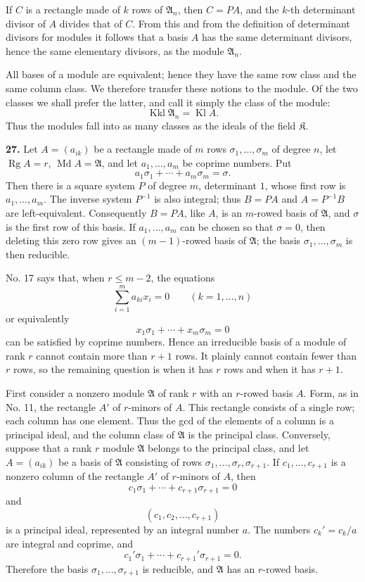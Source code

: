 \documentclass[11pt,a4paper]{article}
\newcommand{\K}{\mathfrak K}
\newcommand{\Kl}{\operatorname{Kl}}
\newcommand{\Kkl}{\operatorname{Kkl}}
\begin{document}
If \(C\) is a rectangle made of \(k\) rows of \(\mathfrak A_n\), then \(C=PA\), and the \(k\)-th determinant divisor of \(A\) divides that of \(C\). From this and from the definition of determinant divisors for modules it follows that a basis \(A\) has the same determinant divisors, hence the same elementary divisors, as the module \(\mathfrak A_n\).

All bases of a module are equivalent; hence they have the same row class and the same column class. We therefore transfer these notions to the module. Of the two classes we shall prefer the latter, and call it simply the class of the module:
\[
 \Kkl\mathfrak A_n=\Kl A.
\]
Thus the modules fall into as many classes as the ideals of the field \(\K\).

\textbf{27.} Let \(A=(a_{ik})\) be a rectangle made of \(m\) rows \(\sigma_1,\ldots,\sigma_m\) of degree \(n\), let \(\operatorname{Rg}A=r\), \(\operatorname{Md}A=\mathfrak A\), and let \(a_1,\ldots,a_m\) be coprime numbers. Put
\[
 a_1\sigma_1+\cdots+a_m\sigma_m=\sigma. \tag{28}
\]
Then there is a square system \(P\) of degree \(m\), determinant \(1\), whose first row is \(a_1,\ldots,a_m\). The inverse system \(P^{-1}\) is also integral; thus \(B=PA\) and \(A=P^{-1}B\) are left-equivalent. Consequently \(B=PA\), like \(A\), is an \(m\)-rowed basis of \(\mathfrak A\), and \(\sigma\) is the first row of this basis. If \(a_1,\ldots,a_m\) can be chosen so that \(\sigma=0\), then deleting this zero row gives an \((m-1)\)-rowed basis of \(\mathfrak A\); the basis \(\sigma_1,\ldots,\sigma_m\) is then reducible.

No. 17 says that, when \(r\le m-2\), the equations
\[
 \sum_{i=1}^{m}a_{ki}x_i=0\qquad(k=1,\ldots,n)
\]
or equivalently
\[
 x_1\sigma_1+\cdots+x_m\sigma_m=0
\]
can be satisfied by coprime numbers. Hence an irreducible basis of a module of rank \(r\) cannot contain more than \(r+1\) rows. It plainly cannot contain fewer than \(r\) rows, so the remaining question is when it has \(r\) rows and when it has \(r+1\).

First consider a nonzero module \(\mathfrak A\) of rank \(r\) with an \(r\)-rowed basis \(A\). Form, as in No. 11, the rectangle \(A'\) of \(r\)-minors of \(A\). This rectangle consists of a single row; each column has one element. Thus the gcd of the elements of a column is a principal ideal, and the column class of \(\mathfrak A\) is the principal class. Conversely, suppose that a rank \(r\) module \(\mathfrak A\) belongs to the principal class, and let \(A=(a_{ik})\) be a basis of \(\mathfrak A\) consisting of rows \(\sigma_1,\ldots,\sigma_r,\sigma_{r+1}\). If \(c_1,\ldots,c_{r+1}\) is a nonzero column of the rectangle \(A'\) of \(r\)-minors of \(A\), then
\[
 c_1\sigma_1+\cdots+c_{r+1}\sigma_{r+1}=0 \tag{29}
\]
and
\[
 (c_1,c_2,\ldots,c_{r+1}) \tag{30}
\]
is a principal ideal, represented by an integral number \(a\). The numbers \(c_k'=c_k/a\) are integral and coprime, and
\[
 c_1'\sigma_1+\cdots+c_{r+1}'\sigma_{r+1}=0.
\]
Therefore the basis \(\sigma_1,\ldots,\sigma_{r+1}\) is reducible, and \(\mathfrak A\) has an \(r\)-rowed basis.
\end{document}
